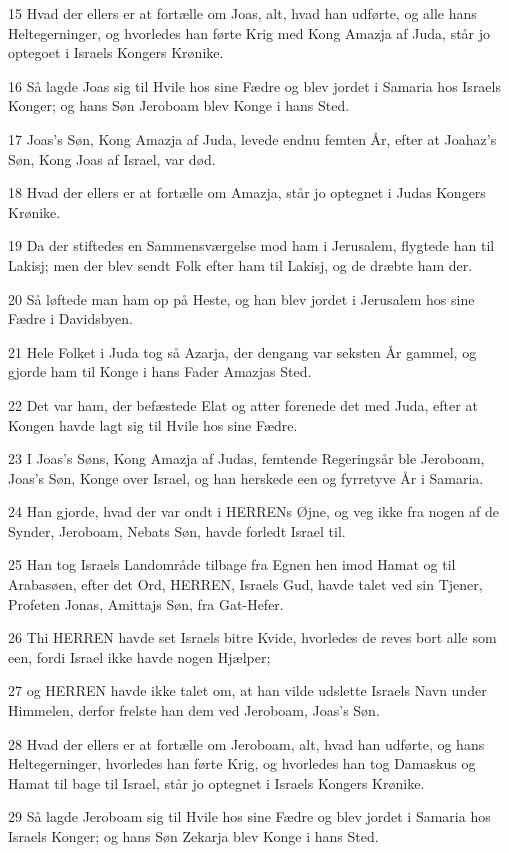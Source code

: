 \par 15 Hvad der ellers er at fortælle om Joas, alt, hvad han udførte, og alle hans Heltegerninger, og hvorledes han førte Krig med Kong Amazja af Juda, står jo optegoet i Israels Kongers Krønike.
\par 16 Så lagde Joas sig til Hvile hos sine Fædre og blev jordet i Samaria hos Israels Konger; og hans Søn Jeroboam blev Konge i hans Sted.
\par 17 Joas's Søn, Kong Amazja af Juda, levede endnu femten År, efter at Joahaz's Søn, Kong Joas af Israel, var død.
\par 18 Hvad der ellers er at fortælle om Amazja, står jo optegnet i Judas Kongers Krønike.
\par 19 Da der stiftedes en Sammensværgelse mod ham i Jerusalem, flygtede han til Lakisj; men der blev sendt Folk efter ham til Lakisj, og de dræbte ham der.
\par 20 Så løftede man ham op på Heste, og han blev jordet i Jerusalem hos sine Fædre i Davidsbyen.
\par 21 Hele Folket i Juda tog så Azarja, der dengang var seksten År gammel, og gjorde ham til Konge i hans Fader Amazjas Sted.
\par 22 Det var ham, der befæstede Elat og atter forenede det med Juda, efter at Kongen havde lagt sig til Hvile hos sine Fædre.
\par 23 I Joas's Søns, Kong Amazja af Judas, femtende Regeringsår ble Jeroboam, Joas's Søn, Konge over Israel, og han herskede een og fyrretyve År i Samaria.
\par 24 Han gjorde, hvad der var ondt i HERRENs Øjne, og veg ikke fra nogen af de Synder, Jeroboam, Nebats Søn, havde forledt Israel til.
\par 25 Han tog Israels Landområde tilbage fra Egnen hen imod Hamat og til Arabasøen, efter det Ord, HERREN, Israels Gud, havde talet ved sin Tjener, Profeten Jonas, Amittajs Søn, fra Gat-Hefer.
\par 26 Thi HERREN havde set Israels bitre Kvide, hvorledes de reves bort alle som een, fordi Israel ikke havde nogen Hjælper;
\par 27 og HERREN havde ikke talet om, at han vilde udslette Israels Navn under Himmelen, derfor frelste han dem ved Jeroboam, Joas's Søn.
\par 28 Hvad der ellers er at fortælle om Jeroboam, alt, hvad han udførte, og hans Heltegerninger, hvorledes han førte Krig, og hvorledes han tog Damaskus og Hamat til bage til Israel, står jo optegnet i Israels Kongers Krønike.
\par 29 Så lagde Jeroboam sig til Hvile hos sine Fædre og blev jordet i Samaria hos Israels Konger; og hans Søn Zekarja blev Konge i hans Sted.

